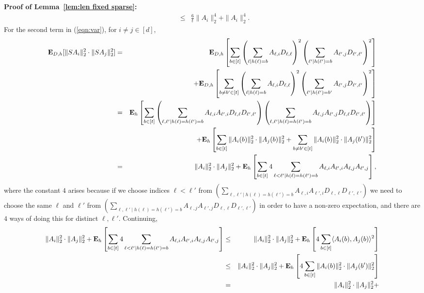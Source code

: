 \documentclass{sig-alternate}
\def\FullBox{\hbox{\vrule width 8pt height 8pt depth 0pt}}
\def\qed{\ifmmode\qquad\FullBox\else{\unskip\nobreak\hfil
\penalty50\hskip1em\null\nobreak\hfil\FullBox
\parfillskip=0pt\finalhyphendemerits=0\endgraf}\fi}
\newenvironment{proofof}[1]{\begin{trivlist} \item {\bf Proof
#1:~~}}
  {\qed\end{trivlist}}
\begin{document}
\begin{proofof}{of Lemma~\ref{lem:len fixed sparse}}
\begin{eqnarray*}
& \leq & \frac{6}{t} \|A_i\|_2^4 + \|A_i\|_2^4.
\end{eqnarray*}
For the second term in (\ref{eqn:var}), for $i \neq j \in [d]$,
\begin{eqnarray*}
{\bf E}_{D,h}[\|SA_i\|_2^2 \cdot \|SA_j\|_2^2]
& = & {\bf E}_{D,h} \left [\sum_{b \in [t]} \left (\sum_{\ell \mid h(\ell) = b} A_{\ell, i} D_{\ell, \ell} \right )^2
\left (\sum_{\ell' \mid h(\ell') = b} A_{\ell', j} D_{\ell', \ell'} \right )^2 \right ]\\
&& + {\bf E}_{D,h} \left [\sum_{b \neq b' \in [t]} \left (\sum_{\ell \mid h(\ell) = b} A_{\ell, i} D_{\ell, \ell} \right )^2
\left (\sum_{\ell' \mid h(\ell') = b'} A_{\ell', j} D_{\ell', \ell'} \right )^2 \right ]\\
& = & {\bf E}_h \left [\sum_{b \in [t]} 
\left (\sum_{\ell, \ell' \mid h(\ell) = h(\ell') = b} A_{\ell, i} A_{\ell',i} D_{\ell, \ell} D_{\ell', \ell'} \right )
\left (\sum_{\ell, \ell' \mid h(\ell) = h(\ell') = b} A_{\ell, j} A_{\ell',j} D_{\ell, \ell} D_{\ell', \ell'} \right ) \right ]\\
&& + {\bf E}_h \left [\sum_{b \in [t]} \|A_i(b)\|_2^2 \cdot \|A_j(b)\|_2^2 
+ \sum_{b \neq b' \in [t]} \|A_i(b)\|_2^2 \cdot \|A_j(b')\|_2^2 \right ]\\
& = & \|A_i\|_2^2 \cdot \|A_j\|_2^2 + {\bf E}_h \left [\sum_{b \in [t]} 4 \sum_{\ell < \ell' \mid h(\ell) = h(\ell') = b} 
A_{\ell, i} A_{\ell', i} A_{\ell, j} A_{\ell', j} \right ],
\end{eqnarray*}
where the constant $4$ arises because if we choose indices $\ell < \ell'$ from
$\left (\sum_{\ell, \ell' \mid h(\ell) = h(\ell') = b} A_{\ell, i} A_{\ell',i} D_{\ell, \ell} D_{\ell', \ell'} \right )$
we need to choose the same $\ell$ and $\ell'$ from
$\left (\sum_{\ell, \ell' \mid h(\ell) = h(\ell') = b} A_{\ell, j} A_{\ell',j} D_{\ell, \ell} D_{\ell', \ell'} \right )$
in order to have a non-zero expectation, and there are $4$ ways of doing this for distinct $\ell, \ell'$.
Continuing, 
\begin{eqnarray*}
\|A_i\|_2^2 \cdot \|A_j\|_2^2 + {\bf E}_h \left [\sum_{b \in [t]} 4 \sum_{\ell < \ell' \mid h(\ell) = h(\ell') = b} 
A_{\ell, i} A_{\ell', i} A_{\ell, j} A_{\ell', j} \right ]
& \leq & \|A_i\|_2^2 \cdot \|A_j\|_2^2 + 
{\bf E}_h \left [4\sum_{b \in [t]}\langle A_i(b), A_j(b) \rangle^2 \right ]\\
& \leq &  \|A_i\|_2^2 \cdot \|A_j\|_2^2 + 
{\bf E}_h \left [4\sum_{b \in [t]} \|A_i(b)\|_2^2 \cdot \|A_j(b')\|_2^2 \right ]\\
& = & \|A_i\|_2^2 \cdot \|A_j\|_2^2 + 

\end{eqnarray*}
\end{proofof}
\end{document}
